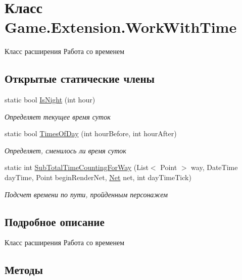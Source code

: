 \hypertarget{class_game_1_1_extension_1_1_work_with_time}{}\section{Класс Game.\+Extension.\+Work\+With\+Time}
\label{class_game_1_1_extension_1_1_work_with_time}


Класс расширения Работа со временем  


\subsection*{Открытые статические члены}
\begin{DoxyCompactItemize}
\item 
static bool \hyperlink{class_game_1_1_extension_1_1_work_with_time_ada6b048bfd14c49efb3d32be4fc27b89}{Is\+Night} (int hour)
\begin{DoxyCompactList}\small\item\em Определяет текущее время суток \end{DoxyCompactList}\item 
static bool \hyperlink{class_game_1_1_extension_1_1_work_with_time_a52617dbfe3480e1fdb61f0fb9a49e5ad}{Times\+Of\+Day} (int hour\+Before, int hour\+After)
\begin{DoxyCompactList}\small\item\em Определяет, сменилось ли время суток \end{DoxyCompactList}\item 
static int \hyperlink{class_game_1_1_extension_1_1_work_with_time_ae37335d8f0245588bd981bd71308a6b6}{Sub\+Total\+Time\+Counting\+For\+Way} (List$<$ Point $>$ way, Date\+Time day\+Time, Point begin\+Render\+Net, \hyperlink{class_game_1_1_models_1_1_net}{Net} net, int day\+Time\+Tick)
\begin{DoxyCompactList}\small\item\em Подсчет времени по пути, пройденным персонажем \end{DoxyCompactList}\end{DoxyCompactItemize}


\subsection{Подробное описание}
Класс расширения Работа со временем 



\subsection{Методы}
\mbox{\label{class_game_1_1_extension_1_1_work_with_time_ada6b048bfd14c49efb3d32be4fc27b89}} 
